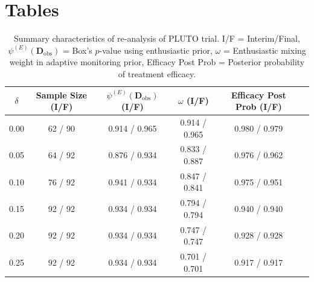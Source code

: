 \documentclass[12pt]{article}
\begin{document}
\section*{Tables}
%
%
\begin{table}[htbp]\label{tbl:real-pluto}%
\centering
\caption{Summary characteristics of re-analysis of PLUTO trial. I/F = Interim/Final, $\psi^{(E)}(\mathbf{D}_{\text{obs}})$ = Box's $p$-value using enthusiastic prior, $\omega$ = Enthusiastic mixing weight in adaptive monitoring prior, Efficacy Post Prob = Posterior probability of treatment efficacy.}%
\begin{tabular*}{450pt}{@{\extracolsep\fill}cccccc@{\extracolsep\fill}}%
\toprule
$\delta$	&	Sample Size (I/F)			&	$\psi^{(E)}(\mathbf{D}_{\text{obs}})$ (I/F)			&	$\omega$ (I/F)			&	Efficacy Post Prob (I/F)			\\
\midrule
0.00	&	62	/	90	&	0.914	/	0.965	&	0.914	/	0.965	&	0.980	/	0.979	\\
0.05	&	64	/	92	&	0.876	/	0.934	&	0.833	/	0.887	&	0.976	/	0.962	\\
0.10	&	76	/	92	&	0.941	/	0.934	&	0.847	/	0.841	&	0.975	/	0.951	\\
0.15	&	92	/	92	&	0.934	/	0.934	&	0.794	/	0.794	&	0.940	/	0.940	\\
0.20	&	92	/	92	&	0.934	/	0.934	&	0.747	/	0.747	&	0.928	/	0.928	\\
0.25	&	92	/	92	&	0.934	/	0.934	&	0.701	/	0.701	&	0.917	/	0.917	\\
\bottomrule
\end{tabular*}
\end{table}
\end{document}
